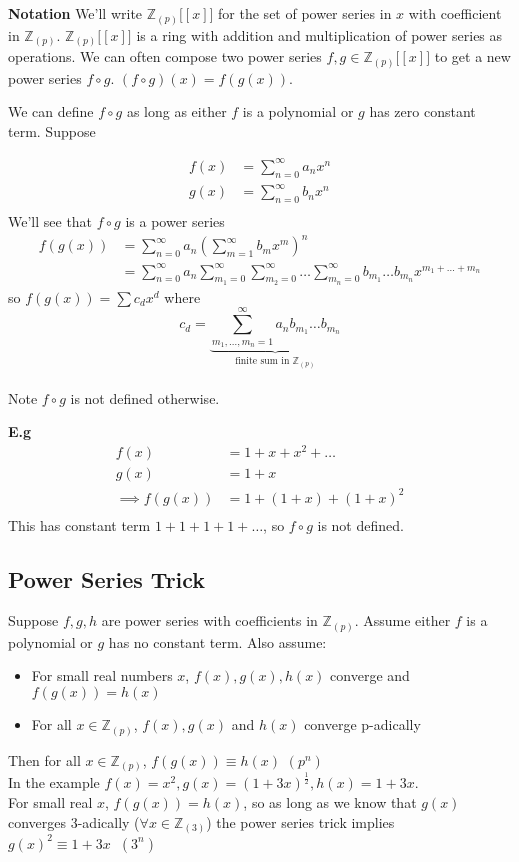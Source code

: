 \documentclass[11pt]{article}
\begin{document}
\textbf{Notation} We'll write $\mathbb{Z}_{(p)}\Big[[x]\Big]$ for the set of power series in $x$ with coefficient in $\mathbb{Z}_{(p)}$. $\mathbb{Z}_{(p)}\Big[[x]\Big]$ is a ring with addition and multiplication of power series as operations. We can often compose two power series $f,g \in \mathbb{Z}_{(p)}\Big[[x]\Big]$ to get a new power series $f \circ g$. $(f \circ g)(x) = f(g(x)) $.

We can define $f \circ g$ as long as either $f$ is a polynomial or $g$ has zero constant term.
Suppose

\begin{align*}
	f(x) &= \sum^\infty_{n=0} a_nx^n\\
	g(x) &= \sum^\infty_{n=0} b_nx^n\\
\end{align*}
We'll see that $f \circ g$ is a power series
\begin{align*}
	f(g(x)) &= \sum_{n=0}^\infty a_n(\sum^\infty_{m=1} b_mx^m)^n\\
	&=  \sum_{n=0}^\infty a_n  \sum_{m_1=0}^\infty  \sum_{m_2=0}^\infty\dots \sum_{m_n=0}^\infty  b_{m_1} \dots b_{m_n} x^{m_1 + \dots + m_n}
\end{align*}
so $f(g(x)) = \sum c_d x^d$ where \[c_d = \underbrace{\sum^\infty_{m_1,\dots,m_n =1} a_nb_{m_1}\dots b_{m_n}}_\text{finite sum in $\mathbb{Z}_{(p)}$}\]\\
Note $f \circ g$ is not defined otherwise.

\textbf{E.g} 
\begin{align*}
	f(x) &= 1+x+x^2 + \dots\\
	g(x) &= 1 + x\\[1em]
	\implies f(g(x)) &= 1 + (1+x) + (1+x)^2\\
\end{align*}
This has constant term $1+1+1+1 + \dots $, so $f\circ g$ is not defined.


\subsection{Power Series Trick}

Suppose $f,g,h$ are power series with coefficients in $\mathbb{Z}_{(p)}$. Assume either $f$ is a polynomial or $g$ has no constant term. Also assume: 

\begin{itemize}
	\item{For small real numbers $x$, $f(x), g(x), h(x)$ converge and $f(g(x)) = h(x)$}
	\item{For all $x \in \mathbb{Z}_{(p)}$, $f(x), g(x)$ and $h(x)$ converge p-adically}
\end{itemize}
Then for all $x \in \mathbb{Z}_{(p)} $, $f(g(x)) \equiv h(x)$ \hspace{7pt} $(p^n)$\\[0.5em]
In the example $f(x) = x^2, g(x) = (1+3x)^\frac{1}{2}, h(x) = 1+3x$.\\
For small real $x$, $f(g(x)) = h(x)$, so as long as we know that $g(x)$ converges 3-adically ($\forall x \in \mathbb{Z}_{(3)}$) the power series trick implies $g(x)^2 \equiv 1+3x \hspace{7pt} (3^n)$\\[1em]
\end{document}
